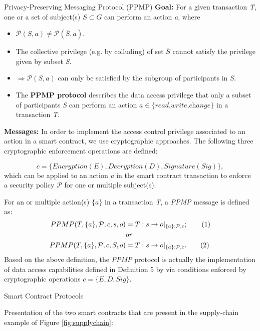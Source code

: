 \documentclass[11pt]{beamer}
\begin{document}
\begin{frame}[allowframebreaks]{Privacy-Preserving Messaging Protocol (PPMP)}
\textbf{Goal:} For a given transaction \textit{T}, one or a set of subject(s) $S \subset G$ can perform an action \textit{a}, where
\begin{itemize}
\item $\mathcal{P}(S,a) \neq \mathcal{P}(\overline{S},a)$.
\item The collective privilege (e.g. by colluding) of set $\overline{S}$ cannot satisfy the privilege given by subset \textit{S}.
\item $\Rightarrow \mathcal{P}(S,a)$ can only be satisfied by the subgroup of participants in \textit{S}.
\item The \textbf{PPMP protocol} describes the data access privilege that only a subset of participants \textit{S} can perform an action $a \in \{\textit{read,write,change}\}$ in a transaction \textit{T}.
\end{itemize}
\textbf{Messages:} In order to implement the access control privilege associated to an action in a smart contract, we use cryptographic approaches. The following three cryptographic enforcement operations are defined:

\[c = \{Encryption(E), Decryption(D), Signature(Sig)\},\] which can be applied to an action \textit{a} in the smart contract transaction to enforce a security policy $\mathcal{P}$ for one or multiple subject(s).

For an or multiple action(s) $\{a\}$ in a transaction \textit{T}, a \textit{PPMP} message is defined as:
\begin{align*}
PPMP(T, \{a\}, \mathcal{P}, c, s, o) &= T: s \rightarrow o|_{\{a\}:\mathcal{P},c}; \stepcounter{equation}\tag{\theequation}\label{ppmpeq1}\\
									  & or\\
PPMP(T, \{a\}, \mathcal{P}, c, S, o) &= T: s \rightarrow o|_{\{a\}:\mathcal{P},c}. \stepcounter{equation}\tag{\theequation}\label{ppmpeq2}
\end{align*}
Based on the above definition, the \textit{PPMP} protocol is actually the implementation of data access capabilities defined in Definition 5 by via conditions enforced by cryptographic operations $c = \{E, D, Sig\}$.
\end{frame}

\begin{frame}{Smart Contract Protocols}

Presentation of the two smart contracts that are present in the supply-chain example of Figure \ref{fig:supplychain}:

\end{frame}
\end{document}
